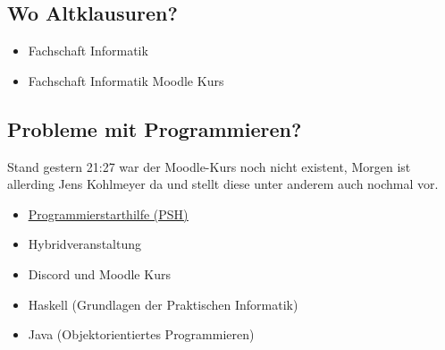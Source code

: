 \documentclass[
	aspectratio=169, 
	10pt 
]{beamer}
\begin{document}
\subsection{Wo Altklausuren?}
\begin{frame}{\insertsubsection}
    \begin{fancycolumns}[widths={30}]
        \nextcolumn

        \centering
        \begin{minipage}[C]{0.8\textwidth}
            \begin{itemize}
                \item Fachschaft Informatik
                \item[$\rightarrow$] Fachschaft Informatik Moodle Kurs 
            \end{itemize}
        \end{minipage}
    \end{fancycolumns}
\end{frame}

\subsection{Probleme mit Programmieren?} %
\begin{frame}{\insertsubsection}
    \begin{fancycolumns}[widths={30}]
        Stand gestern 21:27 war der Moodle-Kurs noch nicht existent,
        Morgen ist allerding Jens Kohlmeyer da und stellt diese unter anderem auch nochmal vor.
        \nextcolumn

        \centering
        \begin{minipage}[C]{0.8\textwidth}
            \begin{itemize}
                \item \underline{\href{https://moodle.uni-ulm.de/course/view.php?id=53212}{Programmierstarthilfe (PSH)}}
                \item Hybridveranstaltung
                \item Discord und Moodle Kurs 
                \item Haskell (Grundlagen der Praktischen Informatik)
                \item Java (Objektorientiertes Programmieren)
            \end{itemize}
        \end{minipage}
    \end{fancycolumns}
\end{frame}
\end{document}
